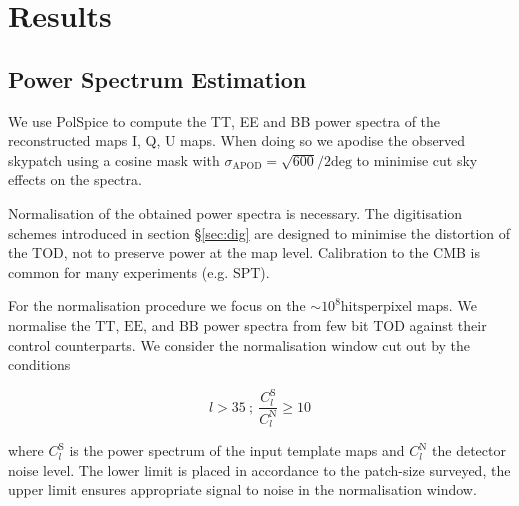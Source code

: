 \documentclass[apj]{emulateapj}
\begin{document}
\section{Results}
\label{sec:results}

\subsection{Power Spectrum Estimation}
\label{subsec:psestimation}

We use PolSpice to compute the TT, EE and BB power spectra of the reconstructed maps I, Q, U maps. When doing so we apodise the observed skypatch using a cosine mask with $\sigma_{\mathrm{APOD}} = \sqrt{600}/2 \mathrm{deg}$ to minimise cut sky effects on the spectra.

%

Normalisation of the obtained power spectra is necessary. The digitisation schemes introduced in section \S\ref{sec:dig} are designed to minimise the distortion of the TOD, not to preserve power at the map level. Calibration to the CMB is common for many experiments (e.g. SPT).

For the normalisation procedure we focus on the $\sim 10^8 \mathrm{hits per pixel}$ maps. We normalise the $\mathrm{TT}$, $\mathrm{EE}$, and $\mathrm{BB}$ power spectra from few bit TOD against their control counterparts. We consider the normalisation window cut out by the conditions

\[ l > 35 \> ; \> \frac{C_l^{\mathrm{S}}}{C_l^{\mathrm{N}}} \geq 10 \]

where $C_l^{\mathrm{S}}$ is the power spectrum of the input template maps and $C_l^{\mathrm{N}}$ the detector noise level. The lower limit is placed in accordance to the patch-size surveyed, the upper limit ensures appropriate signal to noise in the normalisation window.
\end{document}
